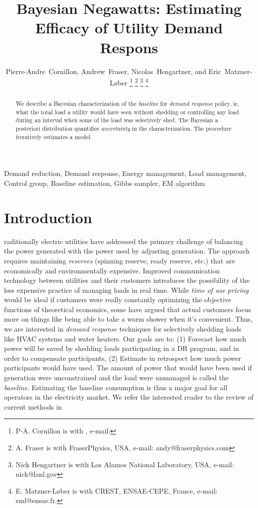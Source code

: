 \documentclass[journal]{IEEEtran}
\begin{document}
\title{Bayesian Negawatts: Estimating Efficacy of Utility Demand Respons}

\author{
  Pierre-Andre~Cornillon,
  Andrew~Fraser,
  Nicolas~Hengartner,
  and Eric~Matzner-L{\o}ber
\thanks{P-A. Cornillon is with , e-mail: }%
\thanks{A. Fraser is with FraserPhysics, USA, e-mail: andy@fraserphysics.com}%
\thanks{Nick Hengartner is with Los Alamos National Laboratory, USA,
  e-mail: nick@lanl.gov}%
\thanks{E. Matzner-L{\o}ber is with CREST, ENSAE-CEPE, France,
  e-mail: eml@ensae.fr.}
}
\maketitle

\begin{abstract}
  We describe a Bayesian characterization of the \emph{baseline} for
  \emph{demand response} policy, ie, what the total load a utility
  would have seen without shedding or controlling any load during an
  interval when some of the load was selectively shed.  The Bayesian a
  posteriori distribution quantifies \emph{uncertainty} in the
  characterization.  The procedure iteratively estimates a model.
\end{abstract}

\begin{IEEEkeywords}
Demand reduction, Demand response, Energy management, Load management,
Control group, Baseline estimation, Gibbs sampler, EM algorithm
\end{IEEEkeywords}

\IEEEpeerreviewmaketitle

\section{Introduction}
\label{sec:intro}

raditionally electric utilities have addressed the
primary challenge of balancing the power generated with the power used
by adjusting generation.  The approach requires maintaining
\emph{reserves} (spinning reserve, ready reserve, etc.) that are
economically and environmentally expensive.  Improved communication
technology between utilities and their customers introduces the
possibility of the less expensive practice of managing loads in real
time.  While \emph{time of use pricing} would be ideal if customers
were really constantly optimizing the objective functions of
theoretical economics, some have argued\cite{meyn} that actual
customers focus more on things like being able to take a warm shower
when it's convenient.  Thus, we are interested in \emph{demand
  response} techniques for selectively shedding loads like HVAC
systems and water heaters.  Our goals are to: (1) Forecast how much
power will be saved by shedding loads participating in a DR program,
and in order to compensate participants, (2) Estimate in retrospect
how much power participants would have used.  The amount of power that
would have been used if generation were unconstrained and the load
were unmanaged is called the \emph{baseline}.  Estimating the baseline
consumption is thus a major goal for all operators in the electricity
market. We refer the interested reader to the review of current
methods in \cite{directestimation}
\end{document}
